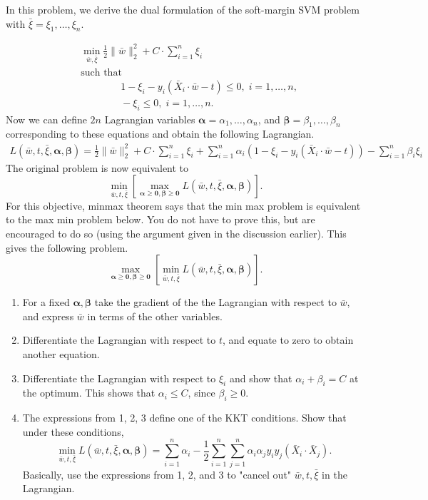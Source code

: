 \documentclass[11pt]{article}
\newenvironment{problem}[2][Problem]{\begin{trivlist}
\item[\hskip \labelsep {\bfseries #1}\hskip \labelsep {\bfseries #2.}]}{\end{trivlist}}
\begin{document}
\begin{problem}{3. (15 points)}
In this problem, we derive the dual formulation of the soft-margin SVM problem with $\bar \xi=\xi_1, \ldots, \xi_n$.

\begin{equation}\label{eq:soft-svm}
\begin{aligned}
& \min_{\bar w, \bar \xi} \frac 12 \|\bar w\|_2^2 +C\cdot \sum_{i=1}^n \xi_i\\
& \text{such that } \\
&\qquad\qquad 1-\xi_i-y_i(\bar X_i\cdot \bar w-t) \leq 0, \; i = 1, \ldots, n,\\
&\qquad\qquad -\xi_i\le 0, \; i = 1, \ldots, n.
\end{aligned}
\end{equation} 
Now we can define $2n$ Lagrangian variables $\bm{\alpha}=\alpha_1, \ldots, \alpha_n$, and $\bm{\beta}= \beta_1, \ldots, \beta_n$ corresponding to these equations and obtain the following Lagrangian.
\begin{equation}
\begin{aligned}
L(\bar w,t,\bar \xi, \bm{\alpha}, \bm{\beta}) = \frac 12 \|\bar w\|_2^2 +C\cdot \sum_{i=1}^n \xi_i + \sum_{i=1}^n\alpha_i(1-\xi_i-y_i(\bar X_i\cdot \bar w-t))-\sum_{i=1}^n \beta_i \xi_i
\end{aligned}
\end{equation} 
The original problem is now equivalent to 
\[
\min_{\bar w, t, \bar \xi}\left[\max_{\bm{\alpha} \geq \bm{0},\bm{\beta} \geq \bm{0}}L(\bar w,t,\bar \xi, \bm{\alpha}, \bm{\beta})\right].
\]
For this objective, minmax theorem says that the min max problem is equivalent to the max min problem below. You do not have to prove this, but are encouraged to do so (using the argument given in the discussion earlier). This gives the following problem.
\[
\max_{\bm{\alpha} \geq \bm{0},\bm{\beta}\geq \bm{0}}\left[\min_{\bar w, t, \bar \xi} L(\bar w,t,\bar \xi, \bm{\alpha}, \bm{\beta})\right].
\]
\begin{enumerate}
\item 
For a fixed $\bm{\alpha}, \bm{\beta}$ take the gradient of the the Lagrangian with respect to $\bar w$, and express $\bar w$ in terms of the other variables. 
\item
Differentiate the Lagrangian with respect to $t$, and equate to zero to obtain another equation. 
\item
Differentiate the Lagrangian with respect to $\xi_i$ and show that $\alpha_i+\beta_i=C$ at the optimum. This shows that $\alpha_i\le C$, since $\beta_i\ge0$.
\item
The expressions from 1, 2, 3 define one of the KKT conditions. Show that under these conditions,
\[
 \min_{\bar w, t, \bar \xi} L(\bar w,t,\bar \xi, \bm{\alpha}, \bm{\beta}) = \sum_{i=1}^n \alpha_i - \frac 12 \sum_{i=1}^n \sum_{j=1}^n \alpha_i\alpha_j y_iy_j(\bar X_i\cdot \bar X_j).
\]
Basically, use the expressions from 1, 2, and 3 to "cancel out" $\bar w, t, \bar \xi$ in the Lagrangian.


\end{enumerate}
\end{problem}
\end{document}
